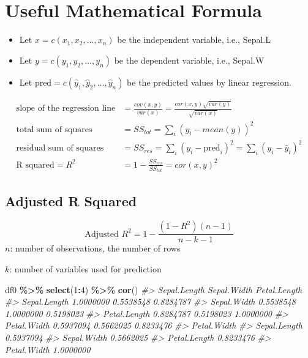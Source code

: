 \documentclass[
  xelatex, ja=standard]{bxjsbook}
\newenvironment{Shaded}{\begin{snugshade}}{\end{snugshade}}
\newcommand{\CommentTok}[1]{\textcolor[rgb]{0.56,0.35,0.01}{\textit{#1}}}
\newcommand{\DecValTok}[1]{\textcolor[rgb]{0.00,0.00,0.81}{#1}}
\newcommand{\FunctionTok}[1]{\textcolor[rgb]{0.13,0.29,0.53}{\textbf{#1}}}
\newcommand{\NormalTok}[1]{#1}
\newcommand{\SpecialCharTok}[1]{\textcolor[rgb]{0.81,0.36,0.00}{\textbf{#1}}}
\providecommand{\tightlist}{%
  \setlength{\itemsep}{0pt}\setlength{\parskip}{0pt}}
\theoremstyle{definition}
\theoremstyle{definition}
\theoremstyle{definition}
\theoremstyle{definition}
\theoremstyle{remark}
\begin{document}
\hypertarget{useful-mathematical-formula}{%
\section{Useful Mathematical Formula}\label{useful-mathematical-formula}}

\begin{itemize}
\tightlist
\item
  Let \(x = c(x_1, x_2, \ldots, x_n)\) be the independent variable, i.e., Sepal.L
\item
  Let \(y = c(y_1, y_2, \ldots, y_n)\) be the dependent variable, i.e., Sepal.W
\item
  Let \(\mbox{pred} = c(\hat{y}_1, \hat{y}_2, \ldots, \hat{y}_n)\) be the predicted values by linear regression.
\end{itemize}

\[
\begin{aligned}
\mbox{slope of the regression line}  &= \frac{cov(x,y)}{var(x)} = \frac{cor(x,y)\sqrt{var(y)}}{\sqrt{var(x)}}\\
\mbox{total sum of squares} &= SS_{tot} = \sum_{i}(y_i-mean(y))^2\\
\mbox{residual sum of squares} &= SS_{res} = \sum_{i}(y_i-\mbox{pred}_i)^2 = \sum_{i}(y_i-\hat{y}_i)^2\\
\mbox{R squared} = R^2 & = 1 - \frac{SS_{res}}{SS_{tot}} = cor(x,y)^2
\end{aligned}
\]

\hypertarget{adjusted-r-squared}{%
\subsection{Adjusted R Squared}\label{adjusted-r-squared}}

\[\text{Adjusted }R^2 = 1- \frac{(1-R^2)(n-1)}{n-k-1}\] \(n\): number of observations, the number of rows

\(k\): number of variables used for prediction

\begin{Shaded}
\begin{Highlighting}[]
\NormalTok{df0 }\SpecialCharTok{\%\textgreater{}\%} \FunctionTok{select}\NormalTok{(}\DecValTok{1}\SpecialCharTok{:}\DecValTok{4}\NormalTok{) }\SpecialCharTok{\%\textgreater{}\%} \FunctionTok{cor}\NormalTok{()}
\CommentTok{\#\textgreater{}              Sepal.Length Sepal.Width Petal.Length}
\CommentTok{\#\textgreater{} Sepal.Length    1.0000000   0.5538548    0.8284787}
\CommentTok{\#\textgreater{} Sepal.Width     0.5538548   1.0000000    0.5198023}
\CommentTok{\#\textgreater{} Petal.Length    0.8284787   0.5198023    1.0000000}
\CommentTok{\#\textgreater{} Petal.Width     0.5937094   0.5662025    0.8233476}
\CommentTok{\#\textgreater{}              Petal.Width}
\CommentTok{\#\textgreater{} Sepal.Length   0.5937094}
\CommentTok{\#\textgreater{} Sepal.Width    0.5662025}
\CommentTok{\#\textgreater{} Petal.Length   0.8233476}
\CommentTok{\#\textgreater{} Petal.Width    1.0000000}
\end{Highlighting}
\end{Shaded}
\end{document}
